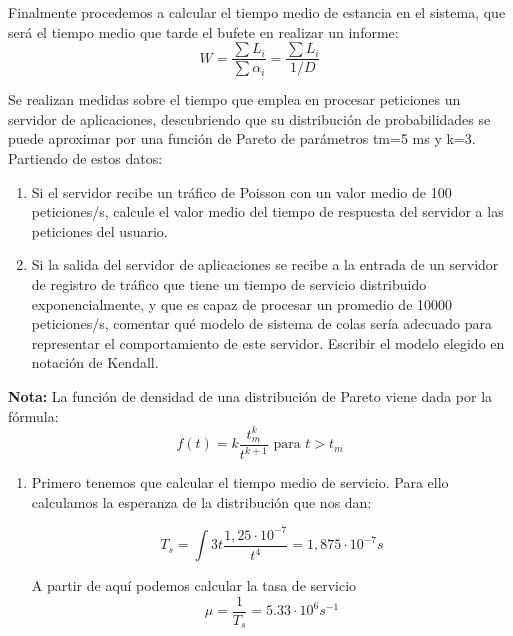 \begin{problem}[21]
\begin{enumerate}
Finalmente procedemos a calcular el tiempo medio de estancia en el sistema, que será el tiempo medio que tarde el bufete en realizar un informe:
\[W = \frac{\sum L_i}{\sum α_i}=\frac{\sum L_i}{1/D}\]
\end{enumerate}


\end{problem}

\begin{problem}[22]
Se realizan medidas sobre el tiempo que emplea en procesar peticiones un servidor de aplicaciones, descubriendo que su distribución de probabilidades se puede aproximar por una función de Pareto de parámetros tm=5 ms y k=3. Partiendo de estos datos:

\begin{enumerate}
\item Si el servidor recibe un tráfico de Poisson con un valor medio de 100 peticiones/s, calcule el valor medio del tiempo de respuesta del servidor a las peticiones del usuario.

\item Si la salida del servidor de aplicaciones se recibe a la entrada de un servidor de registro de tráfico que tiene un tiempo de servicio distribuido exponencialmente, y que es capaz de procesar un promedio de 10000 peticiones/s, comentar qué modelo de sistema de colas sería adecuado para representar el comportamiento de este servidor. Escribir el modelo elegido en notación de Kendall.

\end{enumerate}

\textbf{Nota: } La función de densidad de una distribución de Pareto viene dada por la fórmula:
\[f(t)=k\frac{t_m ^k}{t^{k+1}} \text{ para } t > t_m\]

\solution

\begin{enumerate}
\item Primero tenemos que calcular el tiempo medio de servicio. Para ello calculamos la esperanza de la distribución que nos dan:

\[T_s = \int 3t \frac{1,25\cdot 10^{-7}}{t^4} = 1,875\cdot 10^{-7} s\]

A partir de aquí podemos calcular la tasa de servicio
\[μ=\frac{1}{T_s}=5.33 \cdot 10^6 s^{-1}\]


\end{enumerate}
\end{problem}
